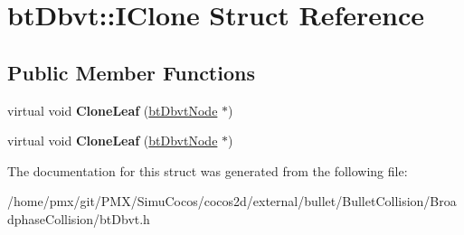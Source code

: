 \hypertarget{structbtDbvt_1_1IClone}{}\section{bt\+Dbvt\+:\+:I\+Clone Struct Reference}
\label{structbtDbvt_1_1IClone}
\subsection*{Public Member Functions}
\begin{DoxyCompactItemize}
\item 
\mbox{\label{structbtDbvt_1_1IClone_a46d26b138398281c542d54d51fc3f565}} 
virtual void {\bfseries Clone\+Leaf} (\hyperlink{structbtDbvtNode}{bt\+Dbvt\+Node} $\ast$)
\item 
\mbox{\label{structbtDbvt_1_1IClone_a46d26b138398281c542d54d51fc3f565}} 
virtual void {\bfseries Clone\+Leaf} (\hyperlink{structbtDbvtNode}{bt\+Dbvt\+Node} $\ast$)
\end{DoxyCompactItemize}


The documentation for this struct was generated from the following file\+:\begin{DoxyCompactItemize}
\item 
/home/pmx/git/\+P\+M\+X/\+Simu\+Cocos/cocos2d/external/bullet/\+Bullet\+Collision/\+Broadphase\+Collision/bt\+Dbvt.\+h\end{DoxyCompactItemize}
